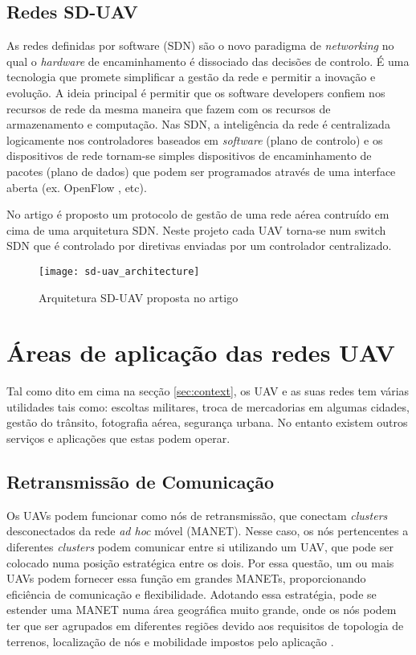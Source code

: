 \subsection{Redes SD-UAV}

As redes definidas por software (SDN) são o novo paradigma de \textit{networking} no qual o \textit{hardware} de encaminhamento é dissociado das decisões de controlo. É uma tecnologia que promete simplificar a gestão da rede e permitir a inovação e evolução. A ideia principal é permitir que os software developers confiem nos recursos de rede da mesma maneira que fazem com os recursos de armazenamento e computação. Nas SDN, a inteligência da rede é centralizada logicamente nos controladores baseados em \textit{software} (plano de controlo) e os dispositivos de rede tornam-se simples dispositivos de encaminhamento de pacotes (plano de dados) que podem ser programados através de uma interface aberta \cite{Nunes2014} (ex. OpenFlow \cite{Leon-Garcia2015}, etc).

No artigo \cite{Secinti2018} é proposto um protocolo de gestão de uma rede aérea contruído em cima de uma arquitetura SDN. Neste projeto cada UAV torna-se num switch SDN que é controlado por diretivas enviadas por um controlador centralizado.

\begin{figure}[H]
\centering
\texttt{[image: sd-uav\_architecture]}
\caption{Arquitetura SD-UAV proposta no artigo  \label{fig:sd-uav_architecture} }\cite{Secinti2018}
\end{figure}



\section{Áreas de aplicação das redes UAV}\label{sec:application}

Tal como dito em cima na secção \ref{sec:context}, os UAV e as suas redes tem várias utilidades tais como: escoltas militares, troca de mercadorias em algumas cidades, gestão do trânsito, fotografia aérea, segurança urbana. No entanto existem outros serviços e aplicações que estas podem operar.

\subsection{Retransmissão de Comunicação}

Os UAVs podem funcionar como nós de retransmissão, que conectam \textit{clusters} desconectados da rede \textit{ad hoc} móvel (MANET).  Nesse caso, os nós pertencentes a diferentes \textit{clusters} podem comunicar entre si utilizando um UAV, que pode ser colocado numa posição estratégica entre os dois. Por essa questão, um ou mais UAVs podem fornecer essa função em grandes MANETs, proporcionando eficiência de comunicação e flexibilidade. Adotando essa estratégia, pode se estender uma MANET numa área geográfica muito grande, onde os nós podem ter que ser agrupados em diferentes regiões devido aos requisitos de topologia de terrenos, localização de nós e mobilidade impostos pelo aplicação \cite{ImadJawhar2017}.

